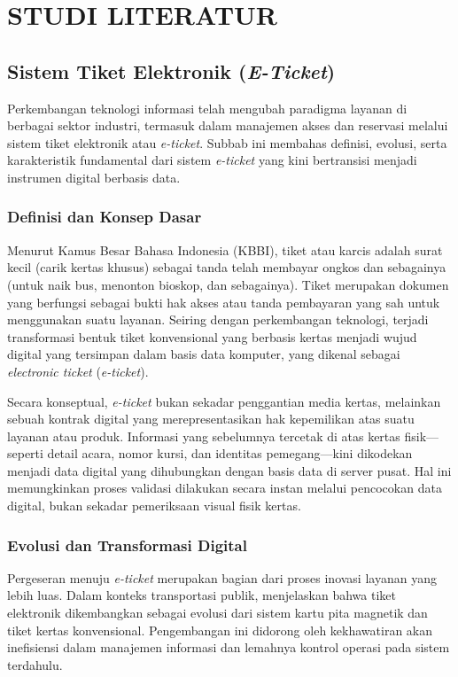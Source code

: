 \cleardoublepage %
\chapter{STUDI LITERATUR}
\label{chap:studi-literatur}
\section{Sistem Tiket Elektronik (\textit{E-Ticket})}
\label{sec:eticket}

Perkembangan teknologi informasi telah mengubah paradigma layanan di berbagai sektor industri, termasuk dalam manajemen akses dan reservasi melalui sistem tiket elektronik atau \textit{e-ticket}. Subbab ini membahas definisi, evolusi, serta karakteristik fundamental dari sistem \textit{e-ticket} yang kini bertransisi menjadi instrumen digital berbasis data.

\subsection{Definisi dan Konsep Dasar}
Menurut Kamus Besar Bahasa Indonesia (KBBI), tiket atau karcis adalah surat kecil (carik kertas khusus) sebagai tanda telah membayar ongkos dan sebagainya (untuk naik bus, menonton bioskop, dan sebagainya). Tiket merupakan dokumen yang berfungsi sebagai bukti hak akses atau tanda pembayaran yang sah untuk menggunakan suatu layanan. Seiring dengan perkembangan teknologi, terjadi transformasi bentuk tiket konvensional yang berbasis kertas menjadi wujud digital yang tersimpan dalam basis data komputer, yang dikenal sebagai \textit{electronic ticket} (\textit{e-ticket}).

Secara konseptual, \textit{e-ticket} bukan sekadar penggantian media kertas, melainkan sebuah kontrak digital yang merepresentasikan hak kepemilikan atas suatu layanan atau produk. Informasi yang sebelumnya tercetak di atas kertas fisik—seperti detail acara, nomor kursi, dan identitas pemegang—kini dikodekan menjadi data digital yang dihubungkan dengan basis data di server pusat. Hal ini memungkinkan proses validasi dilakukan secara instan melalui pencocokan data digital, bukan sekadar pemeriksaan visual fisik kertas.

\subsection{Evolusi dan Transformasi Digital}
Pergeseran menuju \textit{e-ticket} merupakan bagian dari proses inovasi layanan yang lebih luas. Dalam konteks transportasi publik, \textcite{lubeck2012electronic} menjelaskan bahwa tiket elektronik dikembangkan sebagai evolusi dari sistem kartu pita magnetik dan tiket kertas konvensional. Pengembangan ini didorong oleh kekhawatiran akan inefisiensi dalam manajemen informasi dan lemahnya kontrol operasi pada sistem terdahulu.

